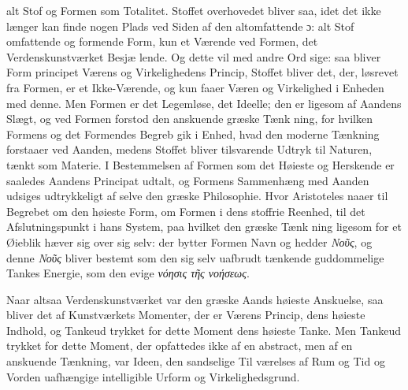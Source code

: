 \documentclass[12pt,a4paper]{book}
\newcommand{\gk}[1]{\textit{#1}}
\begin{document}
alt Stof og Formen som Totalitet. Stoffet overhovedet bliver
saa, idet det ikke længer kan finde nogen Plads ved Siden af
den altomfattende ɔ: alt Stof omfattende og formende Form,
kun et Værende ved Formen, det Verdenskunstværket Besjæ\-%
lende. Og dette vil med andre Ord sige: saa bliver Form\-%
principet Værens og Virkelighedens Princip, Stoffet bliver det,
der, løsrevet fra Formen, er et Ikke-Værende, og kun faaer
Væren og Virkelighed i Enheden med denne. Men Formen
er det Legemløse, det Ideelle; den er ligesom af Aandens
Slægt, og ved Formen forstod den anskuende græske Tænk\-%
ning, for hvilken Formens og det Formendes Begreb gik i
Enhed, hvad den moderne Tænkning forstaaer ved Aanden,
medens Stoffet bliver tilsvarende Udtryk til Naturen, tænkt
som Materie. I Bestemmelsen af Formen som det Høieste og
Herskende er saaledes Aandens Principat udtalt, og Formens
Sammenhæng med Aanden udsiges udtrykkeligt af selve den
græske Philosophie. Hvor Aristoteles naaer til Begrebet om
den høieste Form, om Formen i dens stoffrie Reenhed, til det
Afslutningspunkt i hans System, paa hvilket den græske Tænk\-%
ning ligesom for et Øieblik hæver sig over sig selv: der bytter
Formen Navn og hedder \gk{Νοῦς}, og denne \gk{Νοῦς} bliver bestemt
som den sig selv uafbrudt tænkende guddommelige Tankes
Energie, som den evige \gk{νόησις τῆς νοήσεως}.

Naar altsaa Verdenskunstværket var den græske Aands
høieste Anskuelse, saa bliver det af Kunstværkets Momenter,
der er Værens Princip, dens høieste Indhold, og Tankeud\-%
trykket for dette Moment dens høieste Tanke. Men Tankeud\-%
trykket for dette Moment, der opfattedes ikke af en abstract,
men af en anskuende Tænkning, var Ideen, den sandselige Til\-%
værelses af Rum og Tid og Vorden uafhængige intelligible
Urform og Virkelighedsgrund.
\end{document}
